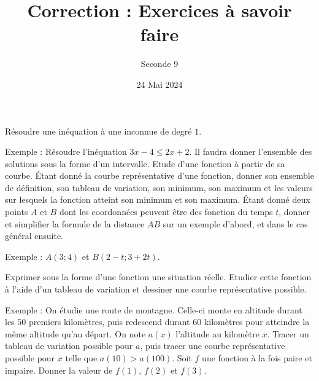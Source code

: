 \documentclass{exam}
\title{Correction : Exercices à savoir faire}
\date{24 Mai 2024}
\author{Seconde 9}
\begin{document}
\maketitle
\begin{questions}
\question
Résoudre une inéquation à une inconnue de degré $1$.

Exemple : Résoudre l'inéquation $3x - 4 \leq 2x + 2$. Il faudra donner l'ensemble des solutions sous la forme d'un intervalle.
\question
Etude d'une fonction à partir de sa courbe. Étant donné la courbe représentative d'une fonction, donner son ensemble de définition, son tableau de variation, son minimum, son maximum et les valeurs sur lesquels la fonction atteint son minimum et son maximum.
\question Étant donné deux points $A$ et $B$ dont les coordonnées peuvent être des fonction du temps $t$, donner et simplifier la formule de la distance $AB$ sur un exemple d'abord, et dans le cas général ensuite.

Exemple : $A(3;4)$ et $B(2-t;3+2t)$.
\question Exprimer sous la forme d'une fonction une situation réelle. Etudier cette fonction à l'aide d'un tableau de variation et dessiner une courbe représentative possible.

Exemple : On étudie une route de montagne. Celle-ci monte en altitude durant les $50$ premiers kilomètres, puis redescend durant $60$ kilomètres pour atteindre la même altitude qu'au départ. On note $a(x)$ l'altitude au kilomètre $x$. Tracer un tableau de variation possible pour $a$, puis tracer une courbe représentative possible pour $x$ telle que $a(10) > a(100)$.
\question Soit $f$ une fonction à la fois paire et impaire. Donner la valeur de $f(1)$, $f(2)$ et $f(3)$.
\end{questions}
\end{document}
